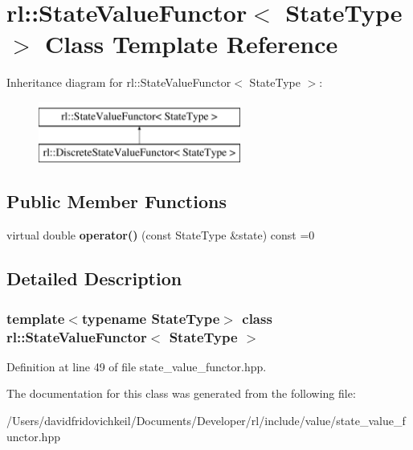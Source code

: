 \hypertarget{classrl_1_1_state_value_functor}{}\section{rl\+:\+:State\+Value\+Functor$<$ State\+Type $>$ Class Template Reference}
\label{classrl_1_1_state_value_functor}
Inheritance diagram for rl\+:\+:State\+Value\+Functor$<$ State\+Type $>$\+:\begin{figure}[H]
\begin{center}
\leavevmode
\includegraphics[height=2.000000cm]{classrl_1_1_state_value_functor}
\end{center}
\end{figure}
\subsection*{Public Member Functions}
\begin{DoxyCompactItemize}
\item 
\hypertarget{classrl_1_1_state_value_functor_a99a5f669d5f15febec82b4f7bfa840dc}{}\label{classrl_1_1_state_value_functor_a99a5f669d5f15febec82b4f7bfa840dc} 
virtual double {\bfseries operator()} (const State\+Type \&state) const =0
\end{DoxyCompactItemize}


\subsection{Detailed Description}
\subsubsection*{template$<$typename State\+Type$>$\newline
class rl\+::\+State\+Value\+Functor$<$ State\+Type $>$}



Definition at line 49 of file state\+\_\+value\+\_\+functor.\+hpp.



The documentation for this class was generated from the following file\+:\begin{DoxyCompactItemize}
\item 
/\+Users/davidfridovichkeil/\+Documents/\+Developer/rl/include/value/state\+\_\+value\+\_\+functor.\+hpp\end{DoxyCompactItemize}
